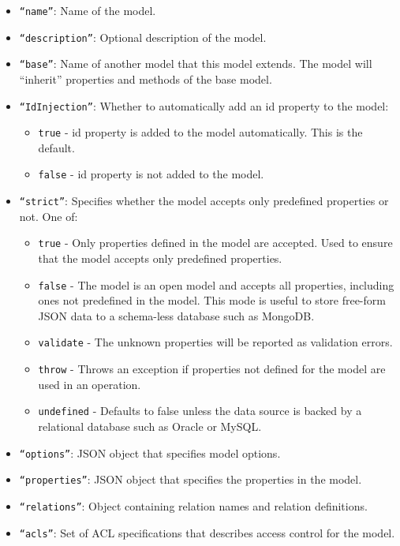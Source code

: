\begin{itemize}
\item \texttt{``name''}: Name of the model.

\item \texttt{``description''}: Optional description of the model.

\item \texttt{``base''}: Name of another model that this model extends. The model will ``inherit'' properties and methods of the base model.

\item \texttt{``IdInjection''}: Whether to automatically add an id property to the model:
\begin{itemize}
\item \texttt{true} - id property is added to the model automatically. This is the default.
\item \texttt{false} - id property is not added to the model.
\end{itemize}

\item \texttt{``strict''}: Specifies whether the model accepts only predefined properties or not. One of:
\begin{itemize}
\item \texttt{true} - Only properties defined in the model are accepted. Used to ensure that the model accepts only predefined properties.
\item \texttt{false} - The model is an open model and accepts all properties, including ones not predefined in the model. This mode is useful to store free-form JSON data to a schema-less database such as MongoDB.
\item \texttt{validate} - The unknown properties will be reported as validation errors.
\item \texttt{throw} - Throws an exception if properties not defined for the model are used in an operation.
\item \texttt{undefined} - Defaults to false unless the data source is backed by a relational database such as Oracle or MySQL.
\end{itemize}

\item \texttt{``options''}: JSON object that specifies model options.

\item \texttt{``properties''}: JSON object that specifies the properties in the model.

\item \texttt{``relations''}: Object containing relation names and relation definitions.

\item \texttt{``acls''}: Set of ACL specifications that describes access control for the model.

\end{itemize}

